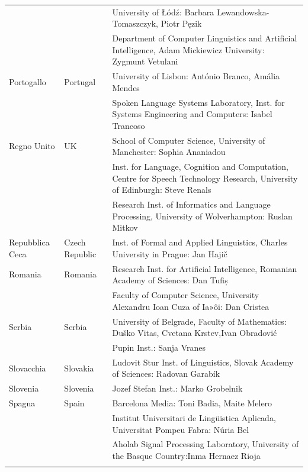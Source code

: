 \begin{longtable}{llp{110mm}}
  & & University of Łódź: Barbara Lewandowska-Tomaszczyk, Piotr Pęzik\\ \addlinespace
  & & Department of Computer Linguistics and Artificial Intelligence, Adam Mickiewicz University: Zygmunt Vetulani \\ \addlinespace
  Portogallo & \textcolor{grey1}{Portugal} & University of Lisbon: António Branco, Amália Mendes \\ \addlinespace
  & & Spoken Language Systems Laboratory, Inst. for Systems Engineering and Computers: Isabel Trancoso \\ \addlinespace
  Regno Unito & \textcolor{grey1}{UK} & 
  School of Computer Science, University of Manchester: Sophia Ananiadou \\ \addlinespace 
  & & Inst. for Language, Cognition and Computation, Centre for Speech Technology Research, University of Edinburgh: Steve Renals \\ \addlinespace 
  & & Research Inst. of Informatics and Language Processing, University of Wolverhampton: Ruslan Mitkov \\ \addlinespace 
  Repubblica Ceca & \textcolor{grey1}{Czech Republic} & Inst. of Formal and Applied Linguistics, Charles University in Prague: Jan Hajič \\ \addlinespace
  Romania & \textcolor{grey1}{Romania} & Research Inst. for Artificial Intelligence, Romanian Academy of Sciences: Dan Tufiș \\ \addlinespace
  & & Faculty of Computer Science, University Alexandru Ioan Cuza of Ia»ôi: Dan Cristea \\ \addlinespace
  Serbia & \textcolor{grey1}{Serbia} & University of Belgrade, Faculty of Mathematics: Duško Vitas, Cvetana Krstev,\newline Ivan Obradović \\ \addlinespace
  & & Pupin Inst.: Sanja Vranes \\ \addlinespace  
  Slovacchia & \textcolor{grey1}{Slovakia} & Ludovit Stur Inst. of Linguistics, Slovak Academy of Sciences: Radovan Garabík \\ \addlinespace 
  Slovenia & \textcolor{grey1}{Slovenia} & Jozef Stefan Inst.: Marko Grobelnik \\ \addlinespace 
  Spagna & \textcolor{grey1}{Spain} & Barcelona Media: Toni Badia, Maite Melero \\ \addlinespace 
  & & Institut Universitari de Lingüistica Aplicada, Universitat Pompeu Fabra: Núria Bel \\ \addlinespace 
  & & Aholab Signal Processing Laboratory, University of the Basque Country:\newline Inma Hernaez Rioja \\ \addlinespace 

\end{longtable}
